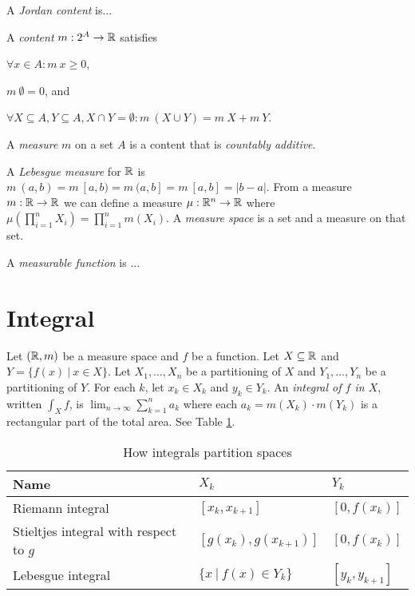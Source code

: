 A \emph{Jordan content} is...

%
A \emph{content} \(m : 2^A \to \mathbb{R}\) satisfies
\begin{enumerate*}[label={(\arabic*)}]
    \item \(\forall x \in A : m~x \ge 0\),
    \item \(m~\emptyset = 0\), and
    \item \(\forall X \subseteq A, Y \subseteq A, X \cap Y = \emptyset : m~(X \cup Y) = m~X + m~Y\).
\end{enumerate*}

%
%
%
A \emph{measure} \(m\) on a set \(A\) is a content that is \emph{countably additive}.

%
%
A \emph{Lebesgue measure} for \(\mathbb{R}\) is
\(m~(a,b) = m~[a,b) = m~(a,b] = m~[a,b] = |b-a|\).
From a measure \(m : \mathbb{R} \to \mathbb{R}\)
we can define a measure \(\mu : \mathbb{R}^n \to \mathbb{R}\)
where
\(\mu \left( \prod_{i=1}^n X_i \right) = \prod_{i=1}^n m(X_i)\).
%
%
%
A \emph{measure space} is a set and a measure on that set.

%
%
A \emph{measurable function} is ...

\section{Integral}

%
%
%
%
%
Let \((\mathbb{R},m)\) be a measure space and \(f\) be a function.
Let \(X \subseteq \mathbb{R}\) and \(Y = \{ f(x) ~|~ x \in X\}\).
Let \(X_1,\ldots,X_n\) be a partitioning of \(X\) and \(Y_1,\ldots,Y_n\) be a partitioning of \(Y\).
For each \(k\), let \(x_k \in X_k\) and \(y_k \in Y_k\).
An \emph{integral of \(f\) in \(X\)}, written \(\int_X f\),
is \(\lim_{n\to\infty} \sum_{k=1}^{n} a_k\)
where each \(a_k = m(X_k) \cdot m(Y_k)\) is a rectangular part of the total area.
See Table \ref{tab:integral}.

\begin{table}[h]
    \caption{How integrals partition spaces}
    \label{tab:integral}
    \centering
\begin{tabular}{lll}
    Name & \(X_k\) & \(Y_k\)
    \\
    \hline
    Riemann integral & \( [x_k,x_{k+1}]\) & \( [0,f(x_k)]\)
    \\
    Stieltjes integral with respect to \(g\) & \( [g(x_k),g(x_{k+1})]\) & \( [0,f(x_k)]\)
    \\
    Lebesgue integral & \( \{x ~|~ f(x) \in Y_k\}\) & \( [y_k,y_{k+1}]\)
\end{tabular}
\end{table}

